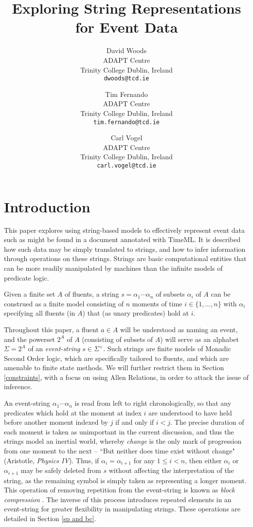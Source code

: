 \documentclass[a4paper,11pt]{article}
\title{Exploring String Representations for Event Data}
\date{}
\author{David Woods\\
	ADAPT Centre\\
	Trinity College Dublin, Ireland\\
	\texttt{dwoods@tcd.ie}
	\and Tim Fernando\\
	ADAPT Centre\\
	Trinity College Dublin, Ireland\\
	\texttt{tim.fernando@tcd.ie}
	\and Carl Vogel\\
	ADAPT Centre\\
	Trinity College Dublin, Ireland\\
	\texttt{carl.vogel@tcd.ie}
}
\begin{document}
\maketitle
\thispagestyle{empty}
\pagestyle{empty}
\section{Introduction}\label{intro}
This paper explores using string-based models to effectively represent event 
data such as might be found in a document annotated with TimeML. It is 
described how such data may be simply translated to strings, and how to infer 
information through operations on these strings. Strings are basic 
computational entities that can be more readily manipulated by machines than 
the infinite models of predicate logic.

Given a finite set $A$ of fluents, a string $s=\alpha_1 \cdots \alpha_n$ 
of subsets $\alpha_i$ of $A$ can be construed as a finite model 
consisting of $n$ moments of time $i \in \{1, \ldots, n\}$ with $\alpha_i$ 
specifying all fluents (in $A$) that (as unary predicates) hold at $i$.

Throughout this paper, a fluent $a \in A$ will be understood as naming 
an event, and the powerset $2^{A}$ of $A$ (consisting of subsets 
of $A$) will serve as an alphabet $\Sigma = 2^{A}$ of an 
\textit{event-string} $s \in \Sigma^+$. Such strings are finite models of 
Monadic Second Order logic, which are specifically tailored to fluents, and 
which are amenable to finite state methods. We will further restrict them in 
Section \ref{constraints}, with a focus on using Allen Relations, in order to 
attack the issue of inference.

An event-string $\alpha_1 \cdots \alpha_n$ is read from left to right 
chronologically, 
so that any predicates which hold at the moment at index $i$ are understood to 
have held before another moment indexed by $j$ if and only if $i < j$. The 
precise duration of each moment is taken as unimportant in the current 
discussion, 
and thus the strings model an inertial world, whereby \textit{change} is the 
only mark of progression from one moment to the next -- ``But neither does time 
exist without change" (Aristotle, \textit{Physics IV}). Thus, if $\alpha_i = 
\alpha_{i+1}$ for any 
$1 \leq i < n$, then either $\alpha_i$ or $\alpha_{i+1}$ may be safely deleted 
from $s$ without 
affecting the interpretation of the string, as the remaining symbol is simply 
taken as representing a longer moment. This operation of removing 
repetition from 
the event-string is known as \textit{block compression} 
\citep{fernando2016prior}. The inverse of this process introduces repeated 
elements in an event-string for greater flexibility in manipulating strings. 
These operations are detailed in Section \ref{sp and bc}.
\end{document}
